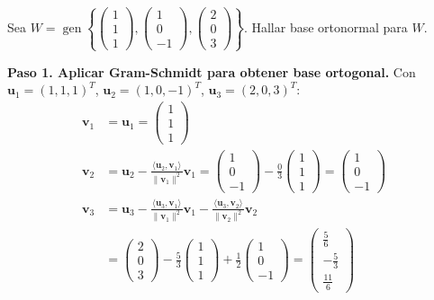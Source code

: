 \begin{example}
Sea $W = \operatorname{gen} \left\{ \begin{pmatrix} 1 \\ 1 \\ 1 \end{pmatrix}, \begin{pmatrix} 1 \\ 0 \\ -1 \end{pmatrix}, \begin{pmatrix} 2 \\ 0 \\ 3 \end{pmatrix} \right\}$. Hallar base ortonormal para $W$.
\begin{myproof}
\textbf{Paso 1. Aplicar Gram-Schmidt para obtener base ortogonal.} Con $\mathbf{u}_1 = (1,1,1)^T$, $\mathbf{u}_2 = (1,0,-1)^T$, $\mathbf{u}_3 = (2,0,3)^T$:
\begin{align*}
\mathbf{v}_1 &= \mathbf{u}_1 = \begin{pmatrix} 1 \\ 1 \\ 1 \end{pmatrix} \\
\mathbf{v}_2 &= \mathbf{u}_2 - \frac{\langle \mathbf{u}_2, \mathbf{v}_1 \rangle}{\|\mathbf{v}_1\|^2} \mathbf{v}_1 = \begin{pmatrix} 1 \\ 0 \\ -1 \end{pmatrix} - \frac{0}{3} \begin{pmatrix} 1 \\ 1 \\ 1 \end{pmatrix} = \begin{pmatrix} 1 \\ 0 \\ -1 \end{pmatrix} \\
\mathbf{v}_3 &= \mathbf{u}_3 - \frac{\langle \mathbf{u}_3, \mathbf{v}_1 \rangle}{\|\mathbf{v}_1\|^2} \mathbf{v}_1 - \frac{\langle \mathbf{u}_3, \mathbf{v}_2 \rangle}{\|\mathbf{v}_2\|^2} \mathbf{v}_2 \\
&= \begin{pmatrix} 2 \\ 0 \\ 3 \end{pmatrix} - \frac{5}{3} \begin{pmatrix} 1 \\ 1 \\ 1 \end{pmatrix} + \frac{1}{2} \begin{pmatrix} 1 \\ 0 \\ -1 \end{pmatrix} = \begin{pmatrix} \frac{5}{6} \\ -\frac{5}{3} \\ \frac{11}{6} \end{pmatrix}
\end{align*}


\end{myproof}
\end{example}
